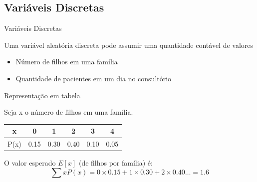 \documentclass{beamer}
\begin{document}
\subsection{Variáveis Discretas}
\begin{frame}{Variáveis Discretas}
  \begin{definition}
    Uma variável aleatória \alert{discreta} pode assumir uma
    quantidade contável de valores
  \end{definition}
  \begin{example}
    \begin{itemize}
    \item Número de filhos em uma família
    \item Quantidade de pacientes em um dia no consultório
    \end{itemize}
  \end{example}
\end{frame}

\begin{frame}{Representação em tabela}
  \begin{example}
    Seja x o número de filhos em uma família. 

    \begin{tabular}{c|ccccc}
      x & 0 & 1 & 2 & 3 & 4\\
      \hline
      P(x) & 0.15 & 0.30  & 0.40 & 0.10 & 0.05\\
    \end{tabular}

    O valor esperado $E[x]$ (de filhos por família) é:
    \begin{displaymath}
      \sum x P(x) = 0 \times 0.15 + 1 \times 0.30 + 2 \times 0.40
      \ldots = 1.6
    \end{displaymath}
  \end{example}
\end{frame}
\end{document}
